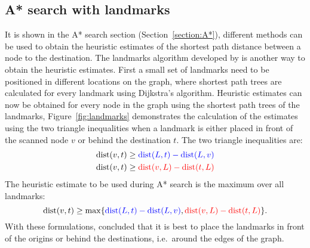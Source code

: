 \subsection{A* search with landmarks}
It is shown in the A* search section (Section~\ref{section:A*}), 
different methods can be used to obtain the heuristic estimates of the shortest path distance between a node to the destination.
The landmarks algorithm developed by \citet{GoldbergLandmarks} is another way to obtain the heuristic estimates.
First a small set of landmarks need to be positioned in different locations on the graph,
where shortest path trees are calculated for every landmark using Dijkstra's algorithm.
Heuristic estimates can now be obtained for every node in the graph using the shortest path trees of the landmarks,
Figure~\ref{fig:landmarks} demonstrates the calculation of the estimates using the two triangle inequalities when a landmark is either placed in front of the scanned node $v$ or behind the destination $t$.
The two triangle inequalities are:
\begin{align}
     \text{dist}(v, t) & \geq \textcolor{blue}{\text{dist}(L,t)-\text{dist}(L,v)} \\
     \text{dist}(v, t) & \geq \textcolor{red}{\text{dist}(v,L)-\text{dist}(t,L)}  
\end{align}
The heuristic estimate to be used during A* search is the maximum over all landmarks:
\begin{equation}
  \text{dist}(v,t) \geq \max\{ \textcolor{blue}{\text{dist}(L,t)-\text{dist}(L,v)}, \textcolor{red}{\text{dist}(v,L)-\text{dist}(t,L)} \}.
\end{equation}
With these formulations, \citet{GoldbergLandmarks} concluded that it is best to place the landmarks in front of the origins or behind the destinations,
i.e.\ around the edges of the graph.

